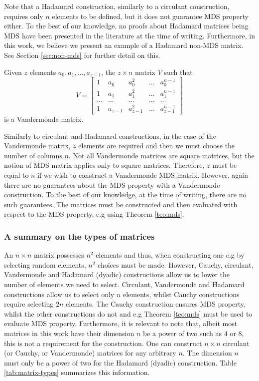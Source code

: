 Note that a Hadamard construction, similarly to a circulant construction, requires only $n$ elements to be defined, but it does not guarantee MDS property either. To the best of our knowledge, no proofs about Hadamard matrices being MDS have been presented in the literature at the time of writing. Furthermore, in this work, we believe we present an example of a Hadamard non-MDS matrix. See Section \ref{sec:non-mds} for further detail on this.

\begin{definition}
Given $z$ elements $a_0, a_1, ..., a_{z-1}$, the $z \times n$ matrix $V$ such that
\begin{equation}\label{eq:cost}
V =
\begin{bmatrix}
1 & a_0 & a_0^2 & ... & a_0^{n-1}\\
1 & a_1 & a_1^2 & ... & a_1^{n-1}\\
... & ... & ... & ... & ...\\
1 & a_{z-1} & a_{z-1}^2 & ... & a_{z-1}^{n-1}
\end{bmatrix}
\end{equation}
is a Vandermonde matrix.
\end{definition}

Similarly to circulant and Hadamard constructions, in the case of the Vandermonde matrix, $z$ elements are required and then we must choose the number of columns $n$. Not all Vandermonde matrices are square matrices, but the notion of MDS matrix applies only to square matrices. Therefore, $z$ must be equal to $n$ if we wish to construct a Vandermonde MDS matrix. However, again there are no guarantees about the MDS property with a Vandermonde construction. To the best of our knowledge, at the time of writing, there are no such guarantees. The matrices must be constructed and then evaluated with respect to the MDS property, e.g using Theorem \ref{teo:mds}.

\subsubsection{A summary on the types of matrices}
An $n\times n$ matrix possesses $n^2$ elements and thus, when constructing one e.g by selecting random elements, $n^2$ choices must be made. However, Cauchy, circulant, Vandermonde and Hadamard (dyadic) constructions allow us to lower the number of elements we need to select. Circulant, Vandermonde and Hadamard constructions allow us to select only $n$ elements, whilst Cauchy constructions require selecting $2n$ elements. The Cauchy construction ensures MDS property, whilst the other constructions do not and e.g Theorem \ref{teo:mds} must be used to evaluate MDS property. Furthermore, it is relevant to note that, albeit most matrices in this work have their dimension $n$ be a power of two such as 4 or 8, this is not a requirement for the construction. One can construct $n \times n$ circulant (or Cauchy, or Vandermonde) matrices for any arbitrary $n$. The dimension $n$ must only be a power of two for the Hadamard (dyadic) construction. Table \ref{tab:matrix-types} summarizes this information.

